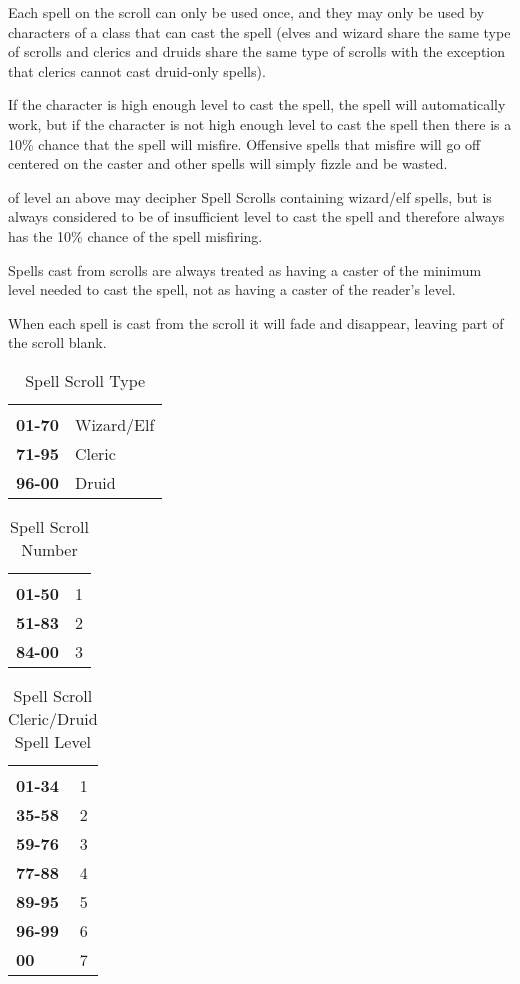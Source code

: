 \begin{multicols*}{2}
Each spell on the scroll can only be used once, and they may only be used by characters of a class that can cast the spell (elves and wizard share the same type of scrolls and clerics and druids share the same type of scrolls with the exception that clerics cannot cast druid-only spells).

If the character is high enough level to cast the spell, the spell will automatically work, but if the character is not high enough level to cast the spell then there is a 10\% chance that the spell will misfire. Offensive spells that misfire will go off centered on the caster and other spells will simply fizzle and be wasted.

 of  level an above may decipher Spell Scrolls containing wizard/elf spells, but is always considered to be of insufficient level to cast the spell and therefore always has the 10\% chance of the spell misfiring.

Spells cast from scrolls are always treated as having a caster of the minimum level needed to cast the spell, not as having a caster of the reader’s level.

When each spell is cast from the scroll it will fade and disappear, leaving part of the scroll blank.

\begin {table}[H]
  \caption{Spell Scroll Type}\label{tab:Spell Scroll Type}
  \begin{tabularx}{\columnwidth}{>{\bfseries}YY}
	 & \\
	01-70 & Wizard/Elf\\
	71-95 & Cleric\\
	96-00 & Druid
  \end {tabularx}
\end {table}

\begin {table}[H]
  \caption{Spell Scroll Number}
  \begin{tabularx}{\columnwidth}{>{\bfseries}YY}
	 & \\
	01-50 & 1\\
	51-83 & 2\\
	84-00 & 3
  \end {tabularx}
\end {table}

\begin {table}[H]
  \caption{Spell Scroll Cleric/Druid Spell Level}
  \begin{tabularx}{\columnwidth}{>{\bfseries}YY}
	 & \\
	01-34 & 1\\
	35-58 & 2\\
	59-76 & 3\\
	77-88 & 4\\
	89-95 & 5\\
	96-99 & 6\\
	00 & 7
  \end {tabularx}
\end {table}


\end{multicols*}

